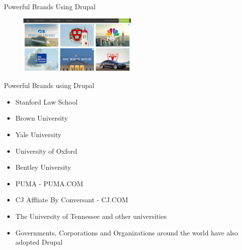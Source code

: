 \documentclass[english,12pt,presentation]{beamer}
\begin{document}
\begin{frame}{Powerful Brands Using Drupal}
\begin{figure}
\centering
\includegraphics[width=220]{images/drupaluser.png}
\end{figure}
\end{frame}

\begin{frame}{Powerful Brands using Drupal}
\begin{itemize}
\pause \item Stanford Law School
\pause \item Brown University
\pause \item Yale University
\pause \item University of Oxford
\pause \item Bentley University
\pause \item PUMA - PUMA.COM
\pause \item CJ Affliate By Conversant - CJ.COM
\pause \item The University of Tennessee and other universities
\pause \item Governments, Corporations and Organizations around the world have also adopted Drupal
\end{itemize}
\end{frame}
\end{document}
